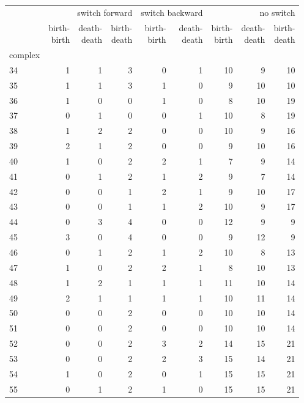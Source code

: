 \documentclass{article}
\begin{document}
\begin{center}
\begin{tabular}{lrrrrrrrr}
\toprule
& \multicolumn{3}{r}{switch forward} & \multicolumn{2}{r}{switch backward} & \multicolumn{3}{r}{no switch} \\
& \makecell{birth-\\birth} & \makecell{death-\\death} & \makecell{birth-\\death} & \makecell{birth-\\birth} & \makecell{death-\\death} & \makecell{birth-\\birth} & \makecell{death-\\death} & \makecell{birth-\\death} \\
complex &  &  &  &  &  &  &  &  \\
\midrule
34 & 1 & 1 & 3 & 0 & 1 & 10 & 9 & 10 \\
35 & 1 & 1 & 3 & 1 & 0 & 9 & 10 & 10 \\
36 & 1 & 0 & 0 & 1 & 0 & 8 & 10 & 19 \\
37 & 0 & 1 & 0 & 0 & 1 & 10 & 8 & 19 \\
38 & 1 & 2 & 2 & 0 & 0 & 10 & 9 & 16 \\
39 & 2 & 1 & 2 & 0 & 0 & 9 & 10 & 16 \\
40 & 1 & 0 & 2 & 2 & 1 & 7 & 9 & 14 \\
41 & 0 & 1 & 2 & 1 & 2 & 9 & 7 & 14 \\
42 & 0 & 0 & 1 & 2 & 1 & 9 & 10 & 17 \\
43 & 0 & 0 & 1 & 1 & 2 & 10 & 9 & 17 \\
44 & 0 & 3 & 4 & 0 & 0 & 12 & 9 & 9 \\
45 & 3 & 0 & 4 & 0 & 0 & 9 & 12 & 9 \\
46 & 0 & 1 & 2 & 1 & 2 & 10 & 8 & 13 \\
47 & 1 & 0 & 2 & 2 & 1 & 8 & 10 & 13 \\
48 & 1 & 2 & 1 & 1 & 1 & 11 & 10 & 14 \\
49 & 2 & 1 & 1 & 1 & 1 & 10 & 11 & 14 \\
50 & 0 & 0 & 2 & 0 & 0 & 10 & 10 & 14 \\
51 & 0 & 0 & 2 & 0 & 0 & 10 & 10 & 14 \\
52 & 0 & 0 & 2 & 3 & 2 & 14 & 15 & 21 \\
53 & 0 & 0 & 2 & 2 & 3 & 15 & 14 & 21 \\
54 & 1 & 0 & 2 & 0 & 1 & 15 & 15 & 21 \\
55 & 0 & 1 & 2 & 1 & 0 & 15 & 15 & 21 \\

\end{tabular}
\end{center}
\end{document}
